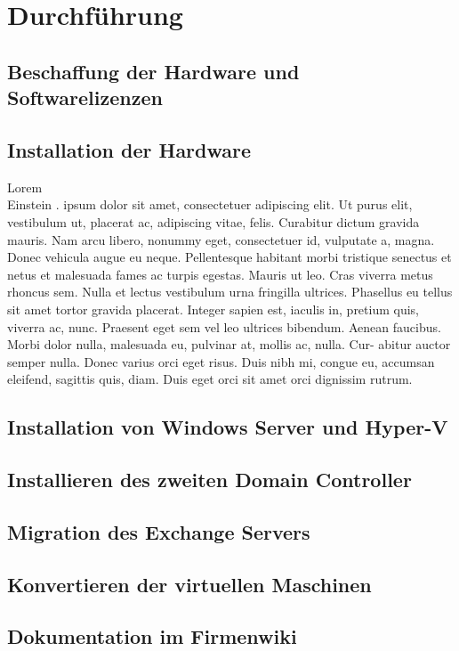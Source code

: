 
\chapter{Durchführung} 
\section{Beschaffung der Hardware und Softwarelizenzen}
\section{Installation der Hardware}
Lorem 
\cite{dirac} \\
Einstein
\cite[S. 15]{einstein}
. ipsum dolor sit amet, consectetuer adipiscing elit. Ut purus elit,
vestibulum ut, placerat ac, adipiscing vitae, felis. Curabitur dictum gravida
mauris. Nam arcu libero, nonummy eget, consectetuer id, vulputate a, magna.
Donec vehicula augue eu neque. Pellentesque habitant morbi tristique senectus
et netus et malesuada fames ac turpis egestas. Mauris ut leo. Cras viverra
metus rhoncus sem. Nulla et lectus vestibulum urna fringilla ultrices. Phasellus
eu tellus sit amet tortor gravida placerat. Integer sapien est, iaculis in, pretium
quis, viverra ac, nunc. Praesent eget sem vel leo ultrices bibendum. Aenean
faucibus. Morbi dolor nulla, malesuada eu, pulvinar at, mollis ac, nulla. Cur-
abitur auctor semper nulla. Donec varius orci eget risus. Duis nibh mi, congue
eu, accumsan eleifend, sagittis quis, diam. Duis eget orci sit amet orci dignissim
rutrum.
\section{Installation von Windows Server und Hyper-V}
\section{Installieren des zweiten Domain Controller}
\section{Migration des Exchange Servers}
\section{Konvertieren der virtuellen Maschinen}
\section{Dokumentation im Firmenwiki}